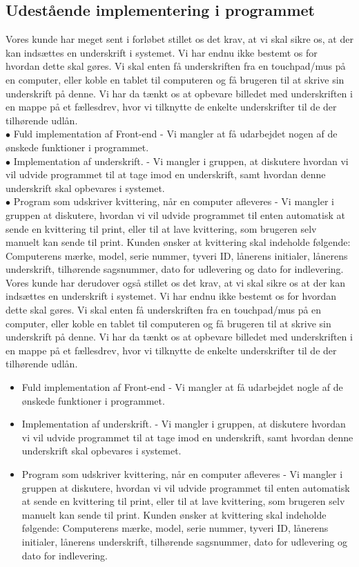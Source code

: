 \documentclass[a4paper]{article}
\begin{document}
\subsection{Udestående implementering i programmet}
Vores kunde har meget sent i forløbet stillet os det krav, at vi skal sikre os, at der kan indsættes en underskrift i systemet. Vi har endnu ikke bestemt os for hvordan dette skal gøres. Vi skal enten få underskriften fra en touchpad/mus på en computer, eller koble en tablet til computeren og få brugeren til at skrive sin underskrift på denne. Vi har da tænkt os at opbevare billedet med underskriften i en mappe på et fællesdrev, hvor vi tilknytte de enkelte underskrifter til de der tilhørende udlån. \\
$\bullet$ Fuld implementation af Front-end - Vi mangler at få udarbejdet nogen af de ønskede funktioner i programmet. \\
$\bullet$ Implementation af underskrift. - Vi mangler i gruppen, at diskutere hvordan vi vil udvide programmet til at tage imod en underskrift, samt hvordan denne underskrift skal opbevares i systemet.\\
$\bullet$ Program som udskriver kvittering, når en computer afleveres - Vi mangler i gruppen at diskutere, hvordan vi vil udvide programmet til enten automatisk at sende en kvittering til print, eller til at lave kvittering, som brugeren selv manuelt kan sende til print. Kunden ønsker at kvittering skal indeholde følgende: Computerens mærke, model, serie nummer, tyveri ID, lånerens initialer, lånerens underskrift, tilhørende sagsnummer, dato for udlevering og dato for indlevering.
Vores kunde har derudover også stillet os det krav, at vi skal sikre os at der kan indsættes en underskrift i systemet. Vi har endnu ikke bestemt os for hvordan dette skal gøres. Vi skal enten få underskriften fra en touchpad/mus på en computer, eller koble en tablet til computeren og få brugeren til at skrive sin underskrift på denne. Vi har da tænkt os at opbevare billedet med underskriften i en mappe på et fællesdrev, hvor vi tilknytte de enkelte underskrifter til de der tilhørende udlån.
\begin{itemize}
	\item Fuld implementation af Front-end - Vi mangler at få udarbejdet nogle af de ønskede funktioner i programmet.
	\item Implementation af underskrift. - Vi mangler i gruppen, at diskutere hvordan vi vil udvide programmet til at tage imod en underskrift, samt hvordan denne underskrift skal opbevares i systemet.
	\item Program som udskriver kvittering, når en computer afleveres - Vi mangler i gruppen at diskutere, hvordan vi vil udvide programmet til enten automatisk at sende en kvittering til print, eller til at lave kvittering, som brugeren selv manuelt kan sende til print. Kunden ønsker at kvittering skal indeholde følgende: Computerens mærke, model, serie nummer, tyveri ID, lånerens initialer, lånerens underskrift, tilhørende sagsnummer, dato for udlevering og dato for indlevering.
\end{itemize}
\newpage
\end{document}
